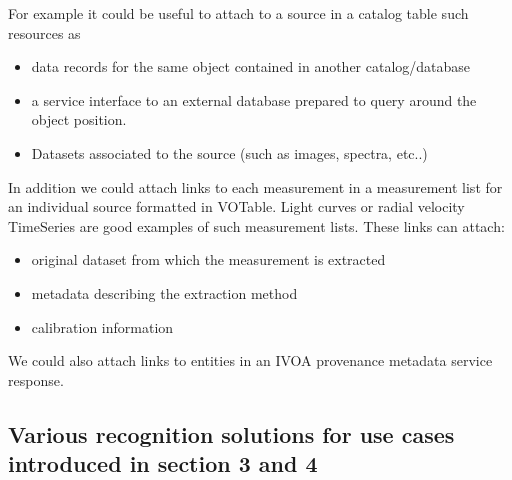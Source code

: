 \documentclass[11pt,a4paper]{ivoa}
\begin{document}
  For example it could be useful to attach to a source in a catalog table such resources as 
\begin{itemize}
\item data  records for the same object contained in another catalog/database 
\item a service interface to an external  database prepared to query around the object 
position.
\item Datasets associated to the source (such as images, spectra, etc..) 
\end{itemize}
     In addition we could attach links to each measurement in a measurement list for an 
individual source formatted in VOTable.  Light curves or radial velocity TimeSeries are 
good examples of such measurement lists. These links can attach:
\begin{itemize}
\item original dataset from which the measurement is extracted 
\item metadata describing the extraction method 
\item calibration information  
\end{itemize}
We could also attach links to entities in an IVOA provenance metadata service response.
\subsection{Various recognition solutions for use cases introduced in section 3 and 4}
\end{document}
